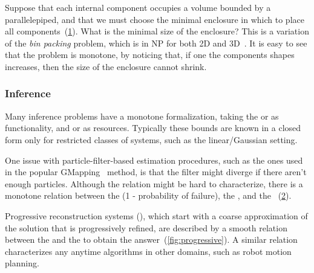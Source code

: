 \begin{example}
	Suppose that each internal component occupies a volume bounded by a parallelepiped, and that we must choose the minimal enclosure in which to place all components~(\cref{fig:packing}).
	What is the minimal size of the enclosure?
	This is a variation of the \emph{bin packing} problem, which is in NP for both 2D and 3D~\cite{lodi02two}.
	It is easy to see that the problem is monotone, by noticing that, if one the components shapes increases, then the size of the enclosure cannot shrink.
\end{example}
\begin{figure}[tbh]
	\centering
	\caption{}
	\label{fig:packing}
\end{figure}

\subsubsection{Inference}

Many inference problems have a monotone formalization, taking the
 or  as functionality, and 
or  as resources.
Typically these bounds are known in a closed form only for restricted classes of systems, such as the linear/Gaussian setting.

\begin{example}[SLAM]
	One issue with particle-filter-based estimation procedures, such as the ones used in the popular GMapping~\cite{grisetti07improved}
	method, is that the filter might diverge if there aren't enough particles.
	Although the relation might be hard to characterize, there is a monotone relation between the  (1 - probability of failure), the , and the ~(\cref{fig:gmapping}).
\end{example}
\begin{figure}[h]
	\centering
	\caption{}
	\label{fig:gmapping}
\end{figure}

\begin{example}
	Progressive reconstruction systems (\cite{locher16progressive}), which start with a coarse approximation of the solution that is progressively refined, are described by a smooth relation between the  and the  to obtain the answer~(\cref{fig:progressive}).
	A similar relation characterizes any anytime algorithms in other domains, such as robot motion planning.
\end{example}


